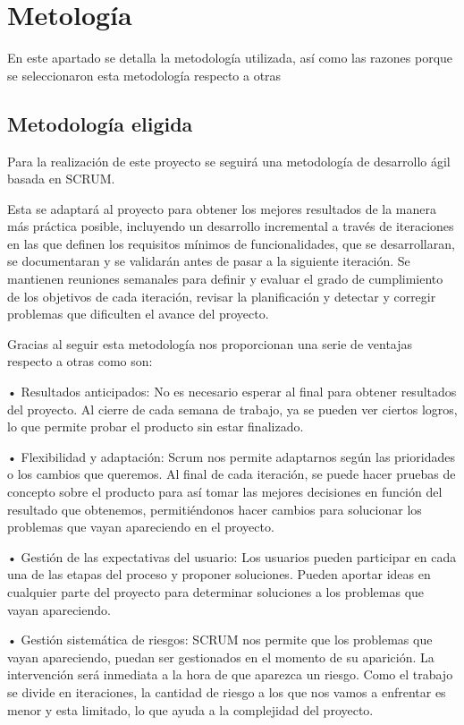 \chapter{Metología}

En este apartado se detalla la metodología utilizada, así como las razones porque se seleccionaron esta metodología respecto a otras


\section{Metodología eligida}

Para la realización de este proyecto se seguirá una metodología de desarrollo ágil basada en SCRUM.

Esta se adaptará al proyecto para obtener los mejores resultados de la manera más práctica posible, incluyendo un desarrollo incremental a través de iteraciones en las que definen los requisitos mínimos de funcionalidades, que se desarrollaran, se documentaran y se validarán antes de pasar a la siguiente iteración. Se mantienen reuniones semanales para definir y evaluar el grado de cumplimiento de los objetivos de cada iteración, revisar la planificación y detectar y corregir problemas que dificulten el avance del proyecto.

Gracias al seguir esta metodología nos proporcionan una serie de ventajas respecto a otras como son:

• Resultados anticipados: No es necesario esperar al final para obtener resultados del proyecto. Al cierre de cada semana de trabajo, ya se pueden ver ciertos logros, lo que permite probar el producto sin estar finalizado.

• Flexibilidad y adaptación: Scrum nos permite adaptarnos según las prioridades o los cambios que queremos.  Al final de cada iteración, se puede hacer pruebas de concepto sobre el producto para así tomar las mejores decisiones en función del resultado que obtenemos, permitiéndonos hacer cambios para solucionar los problemas que vayan apareciendo en el proyecto.

• Gestión de las expectativas del usuario: Los usuarios pueden participar en cada una de las etapas del proceso y proponer soluciones.  Pueden aportar ideas en cualquier parte del proyecto para determinar soluciones a los problemas que vayan apareciendo.

• Gestión sistemática de riesgos: SCRUM nos permite que los problemas que vayan apareciendo, puedan ser gestionados en el momento de su aparición. La intervención será inmediata a la hora de que aparezca un riesgo. Como el trabajo se divide en iteraciones, la cantidad de riesgo a los que nos vamos a enfrentar es menor y esta limitado, lo que ayuda a la complejidad del proyecto.

